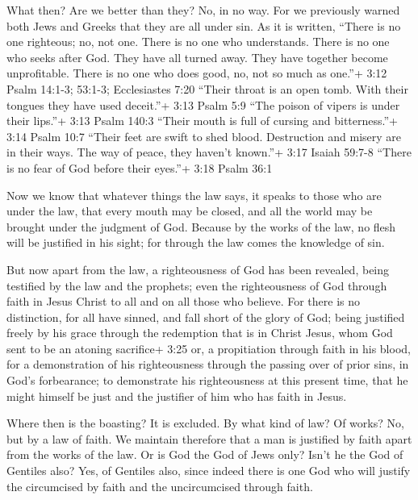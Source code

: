  What then? Are we better than they? No, in no way. For we
previously warned both Jews and Greeks that they are all under sin.
 As it is written, ``There is no one righteous; no, not
one.  There is no one who understands. There is no one who
seeks after God.  They have all turned away. They have
together become unprofitable. There is no one who does good, no, not so
much as one.''+ 3:12 Psalm 14:1-3; 53:1-3; Ecclesiastes 7:20
 ``Their throat is an open tomb. With their tongues they
have used deceit.''+ 3:13 Psalm 5:9 ``The poison of vipers is under
their lips.''+ 3:13 Psalm 140:3  ``Their mouth is full of
cursing and bitterness.''+ 3:14 Psalm 10:7  ``Their feet
are swift to shed blood.  Destruction and misery are in
their ways.  The way of peace, they haven't known.''+ 3:17
Isaiah 59:7-8  ``There is no fear of God before their
eyes.''+ 3:18 Psalm 36:1

 Now we know that whatever things the law says, it speaks
to those who are under the law, that every mouth may be closed, and all
the world may be brought under the judgment of God. 
Because by the works of the law, no flesh will be justified in his
sight; for through the law comes the knowledge of sin.

 But now apart from the law, a righteousness of God has
been revealed, being testified by the law and the prophets;
 even the righteousness of God through faith in Jesus
Christ to all and on all those who believe. For there is no distinction,
 for all have sinned, and fall short of the glory of God;
 being justified freely by his grace through the redemption
that is in Christ Jesus,  whom God sent to be an atoning
sacrifice+ 3:25 or, a propitiation through faith in his blood, for a
demonstration of his righteousness through the passing over of prior
sins, in God's forbearance;  to demonstrate his
righteousness at this present time, that he might himself be just and
the justifier of him who has faith in Jesus.

 Where then is the boasting? It is excluded. By what kind
of law? Of works? No, but by a law of faith.  We maintain
therefore that a man is justified by faith apart from the works of the
law.  Or is God the God of Jews only? Isn't he the God of
Gentiles also? Yes, of Gentiles also,  since indeed there
is one God who will justify the circumcised by faith and the
uncircumcised through faith.

